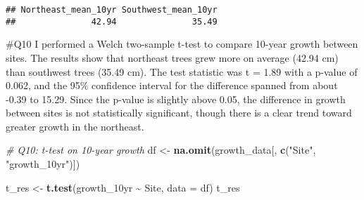 \documentclass[
]{article}
\newenvironment{Shaded}{\begin{snugshade}}{\end{snugshade}}
\newcommand{\AttributeTok}[1]{\textcolor[rgb]{0.13,0.29,0.53}{#1}}
\newcommand{\CommentTok}[1]{\textcolor[rgb]{0.56,0.35,0.01}{\textit{#1}}}
\newcommand{\ConstantTok}[1]{\textcolor[rgb]{0.56,0.35,0.01}{#1}}
\newcommand{\FunctionTok}[1]{\textcolor[rgb]{0.13,0.29,0.53}{\textbf{#1}}}
\newcommand{\NormalTok}[1]{#1}
\newcommand{\OtherTok}[1]{\textcolor[rgb]{0.56,0.35,0.01}{#1}}
\newcommand{\SpecialCharTok}[1]{\textcolor[rgb]{0.81,0.36,0.00}{\textbf{#1}}}
\newcommand{\StringTok}[1]{\textcolor[rgb]{0.31,0.60,0.02}{#1}}
\begin{document}
\begin{Shaded}
\end{Shaded}

\begin{verbatim}
## Northeast_mean_10yr Southwest_mean_10yr 
##               42.94               35.49
\end{verbatim}

\#Q10 I performed a Welch two-sample t-test to compare 10-year growth
between sites. The results show that northeast trees grew more on
average (42.94 cm) than southwest trees (35.49 cm). The test statistic
was t = 1.89 with a p-value of 0.062, and the 95\% confidence interval
for the difference spanned from about -0.39 to 15.29. Since the p-value
is slightly above 0.05, the difference in growth between sites is not
statistically significant, though there is a clear trend toward greater
growth in the northeast.

\begin{Shaded}
\begin{Highlighting}[]
\CommentTok{\# Q10: t{-}test on 10{-}year growth }
\NormalTok{df }\OtherTok{\textless{}{-}} \FunctionTok{na.omit}\NormalTok{(growth\_data[, }\FunctionTok{c}\NormalTok{(}\StringTok{"Site"}\NormalTok{, }\StringTok{"growth\_10yr"}\NormalTok{)])}

\NormalTok{t\_res }\OtherTok{\textless{}{-}} \FunctionTok{t.test}\NormalTok{(growth\_10yr }\SpecialCharTok{\textasciitilde{}}\NormalTok{ Site, }\AttributeTok{data =}\NormalTok{ df)  }
\NormalTok{t\_res                 }
\end{Highlighting}
\end{Shaded}
\end{document}
